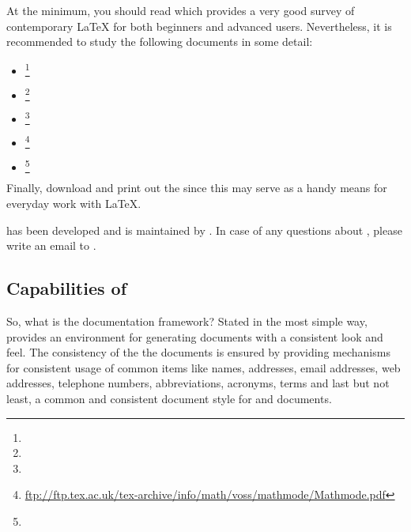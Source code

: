 At the minimum, you should read %
which provides a very good survey of contemporary \LaTeX{} for both beginners and advanced users.
Nevertheless, it is recommended to study the following documents in some detail:
%
\begin{itemize}
   \item {}
         \footnote{}

   \item {}
         \footnote{}

   \item \textquote[]{\KOMAScript}
         \footnote{}

   \item {}
         \footnote{\url{ftp://ftp.tex.ac.uk/tex-archive/info/math/voss/mathmode/Mathmode.pdf}}

   \item {}
         \footnote{}
\end{itemize}
%
Finally, download and print out the %
since this may serve as a handy means for everyday work with \LaTeX.

\wegcLaTeX{} has been developed and is maintained by . In case of
any questions about \wegcLaTeX{}, please write an email to
.



\subsection{Capabilities of \wegcLaTeX{}}
\label{subsec:capabilities}

So, what is the \wegcLaTeX{} documentation framework?
Stated in the most simple way, \wegcLaTeX{} provides an environment for generating documents with a
consistent look and feel. The consistency of the the documents is ensured by providing mechanisms
for consistent usage of common items like names, addresses, email addresses, web addresses, telephone numbers,
abbreviations, acronyms, terms and last but not least, a common and consistent document style for
\singledoc and \multidoc documents.

